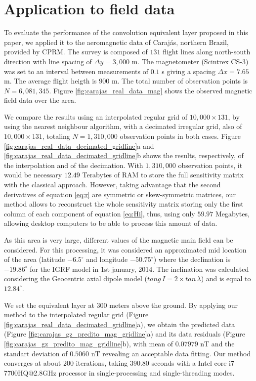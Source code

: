 \section{Application to field data}

To evaluate the performance of the convolution equivalent layer proposed in this paper, we applied it to the aeromagnetic data of Carajás, northern Brazil, provided by CPRM.
The survey is composed of $131$ flight lines along north-south direction with line spacing of 
$\Delta y = 3,000$ m. 
The magnetometer (Scintrex CS-3) was set to an interval between measurements of $0.1$ s giving a spacing $\Delta x = 7.65$ m. The average flight heigth is $900$ m. The total number of observation points is $N = 6,081,345$. Figure \ref{fig:carajas_real_data_mag} shows the observed magnetic field data over the area.

We compare the results using an interpolated regular grid of $10,000 \times 131$, by using the nearest neighbour algorithm, with a decimated irregular grid, also of $10,000 \times 131$, totaling $N = 1,310,000$ observation points in both cases. 
Figure \ref{fig:carajas_real_data_decimated_gridline}a and \ref{fig:carajas_real_data_decimated_gridline}b shows the results, respectively, of the interpolation and of the decimation. 
With $1,310,000$ observation points, it would be necessary $12.49$ Terabytes of RAM to store the full sensitivity matrix with the classical approach. 
However, taking advantage that the second derivatives of equation \ref{eq:r} are symmetric or skew-symmetric matrices, our method allows to reconstruct the whole sensitivity matrix storing only the first column of each component of equation \ref{eq:Hi}, thus, using only $59.97$ Megabytes, allowing desktop computers to be able to process this amount of data.

As this area is very large, different values of the magnetic main field can be considered. 
For this processing, it was considered an approximated mid location of the area (latitude $-6.5^{\circ}$ and longitude $-50.75^{\circ}$) where the declination is $-19.86^{\circ}$ for the IGRF model in 1st january, 2014. The inclination was calculated considering the Geocentric axial dipole model ($tang \, I = 2 \times tan \, \lambda$) and is equal to $12.84^{\circ}$. 

We set the equivalent layer at $300$ meters above the ground.
By applying our method to the interpolated regular grid 
(Figure \ref{fig:carajas_real_data_decimated_gridline}a), we obtain the  predicted data 
(Figure \ref{fig:carajas_gz_predito_mag_gridline}a) and its data residuals 
(Figure \ref{fig:carajas_gz_predito_mag_gridline}b), with mean of $0.07979$ nT and the standart deviation of $0.5060$ nT  revealing an acceptable data fitting.
Our method converges at about 200 iterations,  taking $390.80$ seconds with a Intel core i7 7700HQ@2.8GHz processor in single-processing and single-threading modes. 

